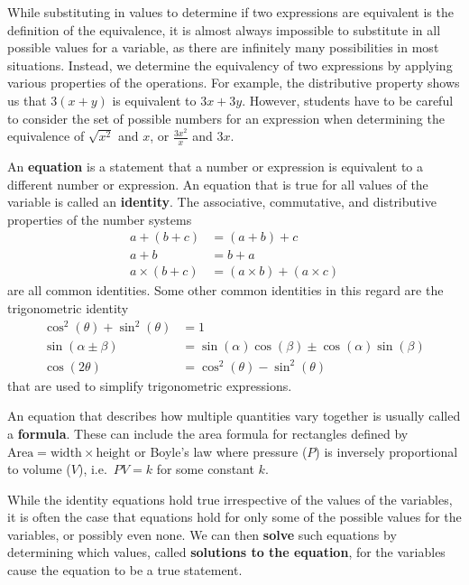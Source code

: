 \documentclass[
]{book}
\theoremstyle{definition}
\theoremstyle{definition}
\theoremstyle{definition}
\theoremstyle{remark}
\begin{document}
While substituting in values to determine if two expressions are equivalent is the definition of the equivalence, it is almost always impossible to substitute in all possible values for a variable, as there are infinitely many possibilities in most situations. Instead, we determine the equivalency of two expressions by applying various properties of the operations. For example, the distributive property shows us that \(3(x+y)\) is equivalent to \(3x+3y\). However, students have to be careful to consider the set of possible numbers for an expression when determining the equivalence of \(\sqrt{x^2}\) and \(x\), or \(\frac{3x^2}{x}\) and \(3x\).

An \textbf{equation} is a statement that a number or expression is equivalent to a different number or expression. An equation that is true for all values of the variable is called an \textbf{identity}. The associative, commutative, and distributive properties of the number systems
\begin{align*}
    a+(b+c) &= (a+b)+c \\
    a+b &= b+a \\
    a \times (b+c) &= (a\times b)+(a\times c)
\end{align*}
are all common identities. Some other common identities in this regard are the trigonometric identity
\begin{align*}
    \cos^2(\theta) + \sin^2(\theta) &= 1  \\
    \sin(\alpha \pm \beta) &= \sin(\alpha)\cos(\beta)\pm \cos(\alpha)\sin(\beta) \\
    \cos(2\theta) &= \cos^2(\theta)-\sin^2(\theta)
\end{align*}
that are used to simplify trigonometric expressions.

An equation that describes how multiple quantities vary together is usually called a \textbf{formula}. These can include the area formula for rectangles defined by \(\mbox{Area}=\mbox{width} \times \mbox{height}\) or Boyle's law where pressure (\(P\)) is inversely proportional to volume (\(V\)), i.e.~\(PV =k\) for some constant \(k\).

While the identity equations hold true irrespective of the values of the variables, it is often the case that equations hold for only some of the possible values for the variables, or possibly even none. We can then \textbf{solve} such equations by determining which values, called \textbf{solutions to the equation}, for the variables cause the equation to be a true statement.
\end{document}
